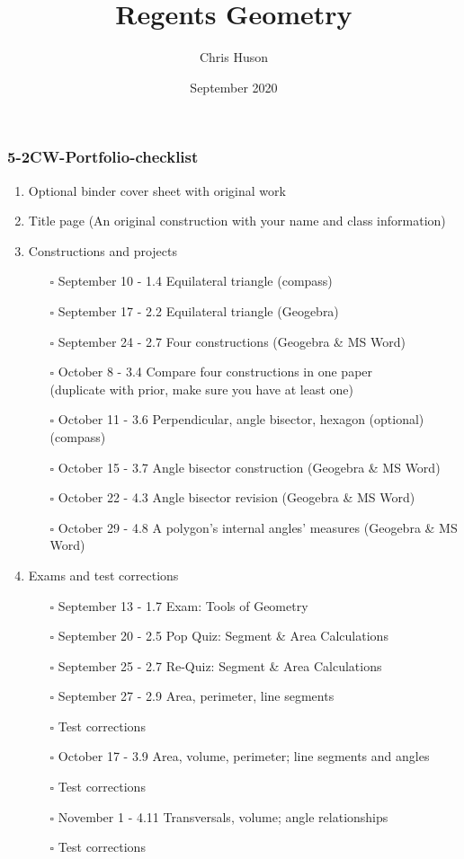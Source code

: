 \documentclass[12pt, twoside]{article}
\title{Regents Geometry}
\author{Chris Huson}
\date{September 2020}
\begin{document}
\subsubsection*{5-2CW-Portfolio-checklist}
\begin{enumerate}
\item Optional binder cover sheet with original work
\item Title page (An original construction with your name and class information)
\item Constructions and projects
    \begin{itemize}
      \item[$\square$] September 10 - 1.4 Equilateral triangle (compass)
      \item[$\square$] September 17 - 2.2 Equilateral triangle (Geogebra)
      \item[$\square$] September 24 - 2.7 Four constructions (Geogebra \& MS Word)
      \item[$\square$] October 8 - 3.4 Compare four constructions in one paper \\(duplicate with prior, make sure you have at least one)
      \item[$\square$] October 11 - 3.6 Perpendicular, angle bisector, hexagon (optional)(compass)
      \item[$\square$] October 15 - 3.7 Angle bisector construction (Geogebra \& MS Word)
      \item[$\square$] October 22 - 4.3 Angle bisector revision (Geogebra \& MS Word)
      \item[$\square$] October 29 - 4.8 A polygon’s internal angles' measures (Geogebra \& MS Word)
    \end{itemize}
  
\item Exams and test corrections
    \begin{itemize}
      \item[$\square$] September 13 - 1.7 Exam: Tools of Geometry
      \item[$\square$] September 20 - 2.5 Pop Quiz: Segment \& Area Calculations
      \item[$\square$] September 25 - 2.7 Re-Quiz: Segment \& Area Calculations
      \item[$\square$] September 27 - 2.9 Area, perimeter, line segments
          \item[$\square$] Test corrections
      \item[$\square$] October 17 - 3.9 Area, volume, perimeter; line segments and angles
        \item[$\square$] Test corrections
     \item[$\square$] November 1 - 4.11 Transversals, volume; angle relationships
      \item[$\square$] Test corrections
  \end{itemize}

\end{enumerate}
\end{document}
